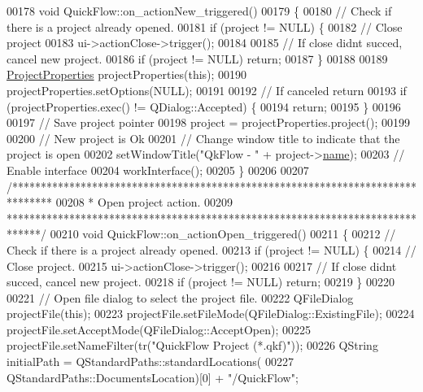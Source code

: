 \begin{DoxyCode}
00178 \textcolor{keywordtype}{void} QuickFlow::on\_actionNew\_triggered()
00179 \{
00180   \textcolor{comment}{// Check if there is a project already opened.}
00181   \textcolor{keywordflow}{if} (project != NULL) \{
00182     \textcolor{comment}{// Close project}
00183     ui->actionClose->trigger();
00184 
00185     \textcolor{comment}{// If close didnt succed, cancel new project.}
00186     \textcolor{keywordflow}{if} (project != NULL) \textcolor{keywordflow}{return};
00187   \}
00188 
00189   \hyperlink{class_project_properties}{ProjectProperties} projectProperties(\textcolor{keyword}{this});
00190   projectProperties.setOptions(NULL);
00191 
00192   \textcolor{comment}{// If canceled return}
00193   \textcolor{keywordflow}{if} (projectProperties.exec() != QDialog::Accepted) \{
00194     \textcolor{keywordflow}{return};
00195   \}
00196 
00197   \textcolor{comment}{// Save project pointer}
00198   project = projectProperties.project();
00199 
00200   \textcolor{comment}{// New project is Ok}
00201   \textcolor{comment}{// Change window title to indicate that the project is open}
00202   setWindowTitle(\textcolor{stringliteral}{"QkFlow - "} + project->\hyperlink{class_project_a82dd2d1bc38f9fd08c9a811fcaa76b38}{name});
00203   \textcolor{comment}{// Enable interface}
00204   workInterface();
00205 \}
00206 
00207 \textcolor{comment}{/*******************************************************************************}
00208 \textcolor{comment}{ * Open project action.}
00209 \textcolor{comment}{ ******************************************************************************/}
00210 \textcolor{keywordtype}{void} QuickFlow::on\_actionOpen\_triggered()
00211 \{
00212   \textcolor{comment}{// Check if there is a project already opened.}
00213   \textcolor{keywordflow}{if} (project != NULL) \{
00214     \textcolor{comment}{// Close project.}
00215     ui->actionClose->trigger();
00216 
00217     \textcolor{comment}{// If close didnt succed, cancel new project.}
00218     \textcolor{keywordflow}{if} (project != NULL) \textcolor{keywordflow}{return};
00219   \}
00220 
00221   \textcolor{comment}{// Open file dialog to select the project file.}
00222   QFileDialog projectFile(\textcolor{keyword}{this});
00223   projectFile.setFileMode(QFileDialog::ExistingFile);
00224   projectFile.setAcceptMode(QFileDialog::AcceptOpen);
00225   projectFile.setNameFilter(tr(\textcolor{stringliteral}{"QuickFlow Project (*.qkf)"}));
00226   QString initialPath = QStandardPaths::standardLocations(
00227                           QStandardPaths::DocumentsLocation)[0] + \textcolor{stringliteral}{"/QuickFlow"};

\end{DoxyCode}
